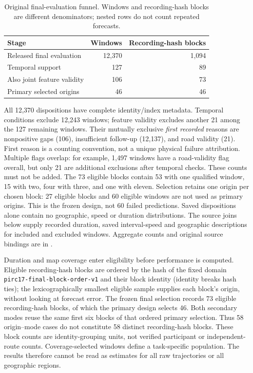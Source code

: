 \begin{table}[htbp]
\centering\small
\caption{Original final-evaluation funnel. Windows and recording-hash blocks
are different denominators; nested rows do not count repeated forecasts.}
\label{tab:final-cohort-funnel}\hypertarget{tab:final-cohort-funnel}{}
\begin{tabular}{@{}lrr@{}}
\toprule
Stage & Windows & Recording-hash blocks\\
\midrule
Released final evaluation & 12,370 & 1,094\\
Temporal support & 127 & 89\\
Also joint feature validity & 106 & 73\\
Primary selected origins & 46 & 46\\
\bottomrule
\end{tabular}
\end{table}
All 12,370 dispositions have complete identity/index metadata. Temporal
conditions exclude 12,243 windows; feature validity excludes another 21
among the 127 remaining windows. Their mutually exclusive \emph{first
recorded} reasons are nonpositive gaps (106), insufficient follow-up
(12,137), and road validity (21). First reason is a counting convention,
not a unique physical failure attribution. Multiple flags overlap: for
example, 1,497 windows have a road-validity flag overall, but only 21 are
additional exclusions after temporal checks. These counts must not be added.
The 73 eligible blocks contain 53 with one qualified window, 15 with two,
four with three, and one with eleven. Selection retains one origin per
chosen block: 27 eligible blocks and 60 eligible windows are not used as
primary origins. This is the frozen design, not 60 failed predictions.
Saved dispositions alone contain no geographic, speed or duration distributions.
The source joins below supply recorded duration, saved interval-speed and
geographic descriptions for included and excluded windows. Aggregate counts
and original source bindings are in .

Duration and map coverage enter eligibility before performance is computed.
Eligible recording-hash blocks are ordered by the hash of the fixed domain
\texttt{pirc17-final-block-order-v1} and their block identity (identity breaks
hash ties); the lexicographically smallest eligible sample supplies each
block's origin, without looking at forecast error. The frozen
final selection records 73 eligible recording-hash blocks, of which the primary
design selects 46. Both secondary modes reuse the same first six blocks of
that ordered primary selection. Thus 58 origin--mode cases do not constitute
58 distinct recording-hash blocks. These block counts are identity-grouping
units, not verified participant or independent-route counts. Coverage-selected
windows define a task-specific population. The results therefore cannot be
read as estimates for all raw trajectories or all geographic regions.

